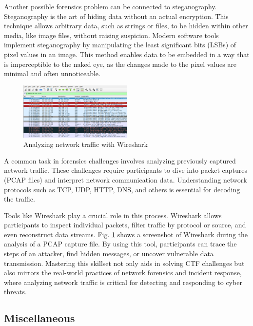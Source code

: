 \documentclass[conference]{IEEEtran}
\begin{document}
Another possible forensics problem can be connected to steganography.
Steganography is the art of hiding data without an actual encryption.
This technique allows arbitrary data, such as strings or files, to be hidden
within other media, like image files, without raising suspicion.
Modern software tools implement steganography by manipulating the least
significant bits (LSBs) of pixel values in an image. This method enables data
to be embedded in a way that is imperceptible to the naked eye, as the changes
made to the pixel values are minimal and often unnoticeable.
\cite{morkel2005}

\begin{figure}[htbp]
	\centering
	\includegraphics[width=0.5\textwidth]{fig/wireshark.png}
	\caption{Analyzing network traffic with Wireshark}
	\label{fig-wireshark}
\end{figure}

A common task in forensics challenges involves analyzing previously captured
network traffic. These challenges require participants to dive into packet
captures (PCAP files) and interpret network communication data.
Understanding network
protocols such as TCP, UDP, HTTP, DNS, and others is essential for decoding the
traffic.

Tools like Wireshark
\cite{ndatinya2015}
play a crucial role in this process. Wireshark allows
participants to inspect individual packets, filter traffic by protocol or
source, and even reconstruct data streams.
Fig. \ref{fig-wireshark} shows a screenshot of Wireshark during the analysis of
a PCAP capture file.
By using this tool, participants can
trace the steps of an attacker, find hidden messages, or uncover vulnerable
data transmission. Mastering this skillset not only aids in solving CTF
challenges but also mirrors the real-world practices of network forensics and
incident response, where analyzing network traffic is critical for detecting
and responding to cyber threats.

\subsection{Miscellaneous}
\end{document}
